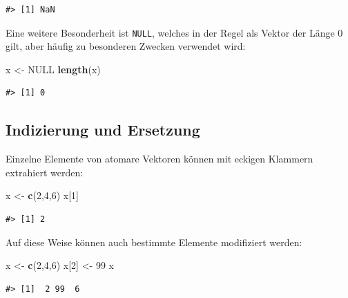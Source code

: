 \documentclass[]{book}
\newenvironment{Shaded}{\begin{snugshade}}{\end{snugshade}}
\newcommand{\KeywordTok}[1]{\textcolor[rgb]{0.13,0.29,0.53}{\textbf{#1}}}
\newcommand{\DecValTok}[1]{\textcolor[rgb]{0.00,0.00,0.81}{#1}}
\newcommand{\StringTok}[1]{\textcolor[rgb]{0.31,0.60,0.02}{#1}}
\newcommand{\OtherTok}[1]{\textcolor[rgb]{0.56,0.35,0.01}{#1}}
\newcommand{\NormalTok}[1]{#1}
\begin{document}
\begin{verbatim}
#> [1] NaN
\end{verbatim}

Eine weitere Besonderheit ist \texttt{NULL}, welches in der Regel als
Vektor der Länge 0 gilt, aber häufig zu besonderen Zwecken verwendet
wird:

\begin{Shaded}
\begin{Highlighting}[]
\NormalTok{x <-}\StringTok{ }\OtherTok{NULL}
\KeywordTok{length}\NormalTok{(x)}
\end{Highlighting}
\end{Shaded}

\begin{verbatim}
#> [1] 0
\end{verbatim}

\subsection{Indizierung und Ersetzung}\label{indizierung-und-ersetzung}

Einzelne Elemente von atomare Vektoren können mit eckigen Klammern
extrahiert werden:

\begin{Shaded}
\begin{Highlighting}[]
\NormalTok{x <-}\StringTok{ }\KeywordTok{c}\NormalTok{(}\DecValTok{2}\NormalTok{,}\DecValTok{4}\NormalTok{,}\DecValTok{6}\NormalTok{)}
\NormalTok{x[}\DecValTok{1}\NormalTok{]}
\end{Highlighting}
\end{Shaded}

\begin{verbatim}
#> [1] 2
\end{verbatim}

Auf diese Weise können auch bestimmte Elemente modifiziert werden:

\begin{Shaded}
\begin{Highlighting}[]
\NormalTok{x <-}\StringTok{ }\KeywordTok{c}\NormalTok{(}\DecValTok{2}\NormalTok{,}\DecValTok{4}\NormalTok{,}\DecValTok{6}\NormalTok{)}
\NormalTok{x[}\DecValTok{2}\NormalTok{] <-}\StringTok{ }\DecValTok{99}
\NormalTok{x}
\end{Highlighting}
\end{Shaded}

\begin{verbatim}
#> [1]  2 99  6
\end{verbatim}
\end{document}
